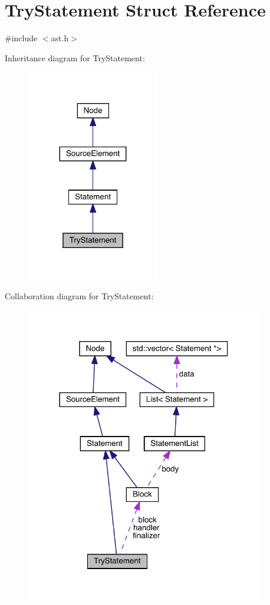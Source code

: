 \hypertarget{struct_try_statement}{}\section{Try\+Statement Struct Reference}
\label{struct_try_statement}


{\ttfamily \#include $<$ast.\+h$>$}



Inheritance diagram for Try\+Statement\+:
\nopagebreak
\begin{figure}[H]
\begin{center}
\leavevmode
\includegraphics[width=164pt]{struct_try_statement__inherit__graph}
\end{center}
\end{figure}


Collaboration diagram for Try\+Statement\+:
\nopagebreak
\begin{figure}[H]
\begin{center}
\leavevmode
\includegraphics[width=294pt]{struct_try_statement__coll__graph}
\end{center}
\end{figure}
